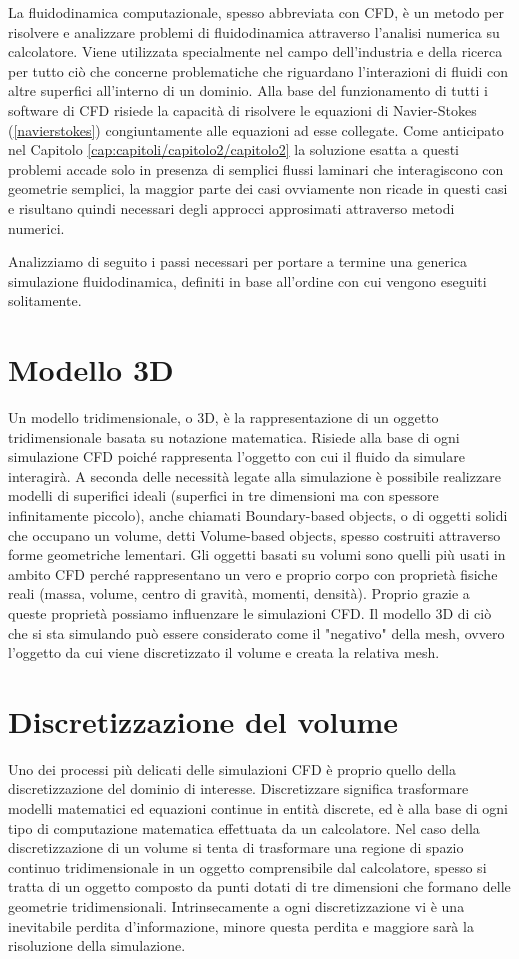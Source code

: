 La fluidodinamica computazionale, spesso abbreviata con CFD, è un metodo per risolvere e analizzare problemi di fluidodinamica attraverso l'analisi numerica su calcolatore.
Viene utilizzata specialmente nel campo dell'industria e della ricerca per tutto ciò che concerne problematiche che riguardano l'interazioni di fluidi con altre superfici all'interno di un dominio.
Alla base del funzionamento di tutti i software di CFD risiede la capacità di risolvere le equazioni di Navier-Stokes (\ref{navierstokes}) congiuntamente alle equazioni ad esse collegate.
Come anticipato nel Capitolo \ref{cap:capitoli/capitolo2/capitolo2} la soluzione esatta a questi problemi accade solo in presenza di semplici flussi laminari che interagiscono con geometrie semplici,
la maggior parte dei casi ovviamente non ricade in questi casi e risultano quindi necessari degli approcci approsimati attraverso metodi numerici.

Analizziamo di seguito i passi necessari per portare a termine una generica simulazione fluidodinamica, definiti in base all'ordine con cui vengono eseguiti solitamente.
\section{Modello 3D}
Un modello tridimensionale, o 3D, è la rappresentazione di un oggetto tridimensionale basata su notazione matematica. Risiede alla base di ogni simulazione CFD poiché rappresenta l'oggetto con cui
il fluido da simulare interagirà. A seconda delle necessità legate alla simulazione è possibile realizzare modelli di superifici ideali (superfici in tre dimensioni ma con spessore infinitamente piccolo), anche chiamati
Boundary-based objects, o di oggetti solidi che occupano un volume, detti Volume-based objects, spesso costruiti attraverso forme geometriche lementari.
Gli oggetti basati su volumi sono quelli più usati in ambito CFD perché rappresentano un vero e proprio corpo con proprietà fisiche reali (massa, volume, centro di gravità, momenti, densità).
Proprio grazie a queste proprietà possiamo influenzare le simulazioni CFD. Il modello 3D di ciò che si sta simulando può essere considerato come il "negativo" della mesh, ovvero l'oggetto da
cui viene discretizzato il volume e creata la relativa mesh.
\section{Discretizzazione del volume}
Uno dei processi più delicati delle simulazioni CFD è proprio quello della discretizzazione del dominio di interesse. Discretizzare significa trasformare modelli matematici ed equazioni continue
in entità discrete, ed è alla base di ogni tipo di computazione matematica effettuata da un calcolatore. Nel caso della discretizzazione di un volume si tenta di trasformare una regione di spazio
continuo tridimensionale in un oggetto comprensibile dal calcolatore, spesso si tratta di un oggetto composto da punti dotati di tre dimensioni che formano delle geometrie tridimensionali.
Intrinsecamente a ogni discretizzazione vi è una inevitabile perdita d'informazione, minore questa perdita e maggiore sarà la risoluzione della simulazione.

